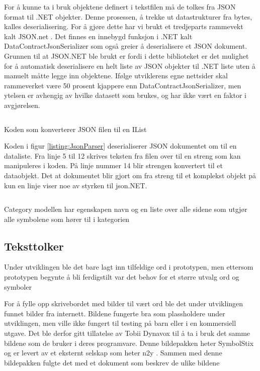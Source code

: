 {For å kunne ta i bruk objektene definert i tekstfilen må de tolkes fra JSON format til .NET objekter. Denne prosessen, å trekke ut datastrukturer fra bytes, kalles deserialisering. For å gjøre dette har vi brukt et tredjeparts rammevekt kalt JSON.net \cite{Json.0:online}. Det finnes en innebygd funksjon i .NET kalt DataContractJsonSerializer \cite{DataC3:online} som også greier å deserialisere et JSON dokument. Grunnen til at JSON.NET ble brukt er fordi i dette biblioteket er det mulighet for å automatisk deserialisere en helt liste av JSON objekter til .NET liste uten å manuelt måtte legge inn objektene. Ifølge utviklerens egne nettsider skal rammeverket være 50 prosent kjappere enn DataContractJsonSerializer, men ytelsen er avhengig av hvilke datasett som brukes, og har ikke vært en faktor i avgjørelsen. 


\begin{listing}[ht] 
\inputminted[fontsize=\footnotesize, frame=lines,framesep=2mm,baselinestretch=1.2,bgcolor=lightgray,linenos]{csharp}{Code/JSONparser.cs} 
\caption{Koden som konverterer JSON filen til en IList} 
\label{listing:JsonParser} 
\end{listing} 


Koden i figur \ref{listing:JsonParser} deserialiserer JSON dokumentet om til en dataliste. Fra linje 5 til 12 skrives teksten fra filen over til en streng som kan manipuleres i koden. På linje nummer 14 blir strengen konvertert til et dataobjekt. Det at dokumentet blir gjort om fra streng til et komplekst objekt på kun en linje viser noe av styrken til json.NET. 

\begin{listing}[ht] 
\inputminted[fontsize=\footnotesize, frame=lines,framesep=2mm,baselinestretch=1.2,bgcolor=lightgray,linenos]{csharp}{Code/CategoryModel.cs} 
\caption{Category modellen har egenskapen navn og en liste over alle sidene som utgjør alle symbolene som hører til i kategorien} 
\label{listing:CategoryModel} 
\end{listing} 


\subsection{Teksttolker}

Under utviklingen ble det bare lagt inn tilfeldige ord i prototypen, men ettersom prototypen begynte å bli ferdigstilt var det behov for et større utvalg ord og symboler


For å fylle opp skrivebordet med bilder til vært ord ble det under utviklingen funnet bilder fra internett. Bildene fungerte bra som plassholdere under utviklingen, men ville ikke fungert til testing på barn eller i en kommersiell utgave. Det ble derfor gitt tillatelse av Tobii Dynavox til å ta i bruk det samme bildene som de bruker i deres programvare. Denne bildepakken heter SymbolStix og er levert av et eksternt selskap som heter n2y \cite{n2y}. Sammen med denne bildepakken fulgte det med et dokument som beskrev de ulike bildene


}
